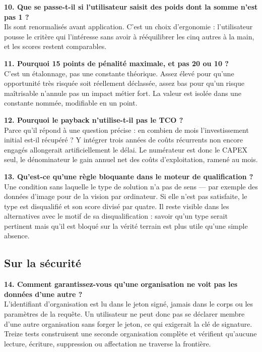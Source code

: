\textbf{10. Que se passe-t-il si l'utilisateur saisit des poids dont la somme n'est pas
1 ?}\\
Ils sont renormalisés avant application. C'est un choix d'ergonomie : l'utilisateur
pousse le critère qui l'intéresse sans avoir à rééquilibrer les cinq autres à la main,
et les scores restent comparables.

\textbf{11. Pourquoi 15 points de pénalité maximale, et pas 20 ou 10 ?}\\
C'est un étalonnage, pas une constante théorique. Assez élevé pour qu'une opportunité
très risquée soit réellement déclassée, assez bas pour qu'un risque maîtrisable
n'annule pas un impact métier fort. La valeur est isolée dans une constante nommée,
modifiable en un point.

\textbf{12. Pourquoi le payback n'utilise-t-il pas le TCO ?}\\
Parce qu'il répond à une question précise : en combien de mois l'investissement initial
est-il récupéré ? Y intégrer trois années de coûts récurrents non encore engagés
allongerait artificiellement le délai. Le numérateur est donc le CAPEX seul, le
dénominateur le gain annuel net des coûts d'exploitation, ramené au mois.

\textbf{13. Qu'est-ce qu'une règle bloquante dans le moteur de qualification ?}\\
Une condition sans laquelle le type de solution n'a pas de sens — par exemple des
données d'image pour de la vision par ordinateur. Si elle n'est pas satisfaite, le type
est disqualifié et son score divisé par quatre. Il reste visible dans les alternatives
avec le motif de sa disqualification : savoir qu'un type serait pertinent mais qu'il est
bloqué sur la vérité terrain est plus utile qu'une simple absence.

\subsection*{Sur la sécurité}

\textbf{14. Comment garantissez-vous qu'une organisation ne voit pas les données d'une
autre ?}\\
L'identifiant d'organisation est lu dans le jeton signé, jamais dans le corps ou les
paramètres de la requête. Un utilisateur ne peut donc pas se déclarer membre d'une autre
organisation sans forger le jeton, ce qui exigerait la clé de signature. Treize tests
construisent une seconde organisation complète et vérifient qu'aucune lecture, écriture,
suppression ou affectation ne traverse la frontière.


